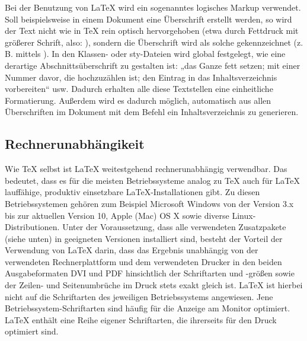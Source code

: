 Bei der Benutzung von LaTeX wird ein sogenanntes logisches Markup verwendet. Soll beispielsweise in einem Dokument eine Überschrift erstellt werden, so wird der Text nicht wie in TeX rein optisch hervorgehoben (etwa durch Fettdruck mit größerer Schrift, also: ), sondern die Überschrift wird als solche gekennzeichnet (z. B. mittels ). In den Klassen- oder sty-Dateien wird global festgelegt, wie eine derartige Abschnittsüberschrift zu gestalten ist: „das Ganze fett setzen; mit einer Nummer davor, die hochzuzählen ist; den Eintrag in das Inhaltsverzeichnis vorbereiten“ usw. Dadurch erhalten alle diese Textstellen eine einheitliche Formatierung. Außerdem wird es dadurch möglich, automatisch aus allen Überschriften im Dokument mit dem Befehl  ein Inhaltsverzeichnis zu generieren.

\subsection{Rechnerunabhängikeit}

Wie TeX selbst ist LaTeX weitestgehend rechnerunabhängig verwendbar. Das bedeutet, dass es für die meisten Betriebssysteme analog zu TeX auch für LaTeX lauffähige, produktiv einsetzbare LaTeX-Installationen gibt. Zu diesen Betriebssystemen gehören zum Beispiel Microsoft Windows von der Version 3.x bis zur aktuellen Version 10, Apple (Mac) OS X sowie diverse Linux-Distributionen. Unter der Voraussetzung, dass alle verwendeten Zusatzpakete (siehe unten) in geeigneten Versionen installiert sind, besteht der Vorteil der Verwendung von LaTeX darin, dass das Ergebnis unabhängig von der verwendeten Rechnerplattform und dem verwendeten Drucker in den beiden Ausgabeformaten DVI und PDF hinsichtlich der Schriftarten und -größen sowie der Zeilen- und Seitenumbrüche im Druck stets exakt gleich ist. LaTeX ist hierbei nicht auf die Schriftarten des jeweiligen Betriebssystems angewiesen. Jene Betriebssystem-Schriftarten sind häufig für die Anzeige am Monitor optimiert. LaTeX enthält eine Reihe eigener Schriftarten, die ihrerseits für den Druck optimiert sind.

